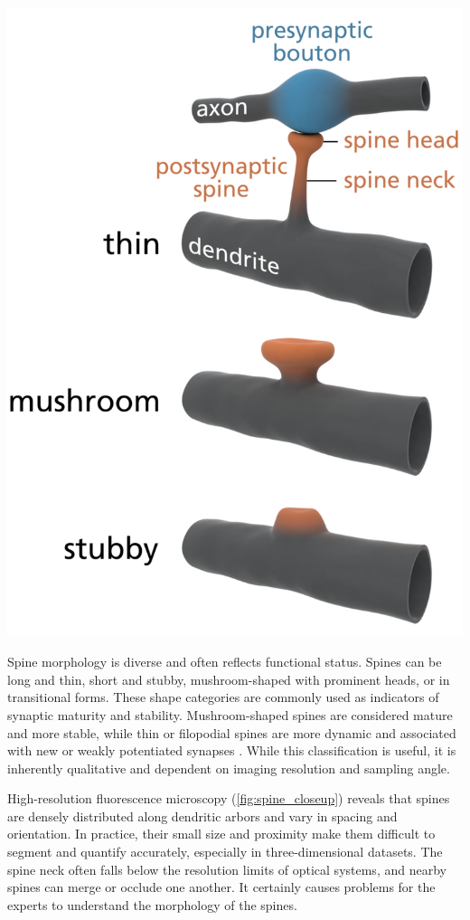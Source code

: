 \begin{center}
    \includegraphics[width=.6\textwidth]{figures/04_spine_3d.png} 
    \label{fig:spine_3d}
\end{center}

Spine morphology is diverse and often reflects functional status. Spines can be long and thin, short and stubby, mushroom-shaped with prominent heads, or in transitional forms. These shape categories are commonly used as indicators of synaptic maturity and stability. Mushroom-shaped spines are considered mature and more stable, while thin or filopodial spines are more dynamic and associated with new or weakly potentiated synapses \cite{Vidaurre_2022}. While this classification is useful, it is inherently qualitative and dependent on imaging resolution and sampling angle.

High-resolution fluorescence microscopy (\autoref{fig:spine_closeup}) reveals that spines are densely distributed along dendritic arbors and vary in spacing and orientation. In practice, their small size and proximity make them difficult to segment and quantify accurately, especially in three-dimensional datasets. The spine neck often falls below the resolution limits of optical systems, and nearby spines can merge or occlude one another. It certainly causes problems for the experts to understand the morphology of the spines.

